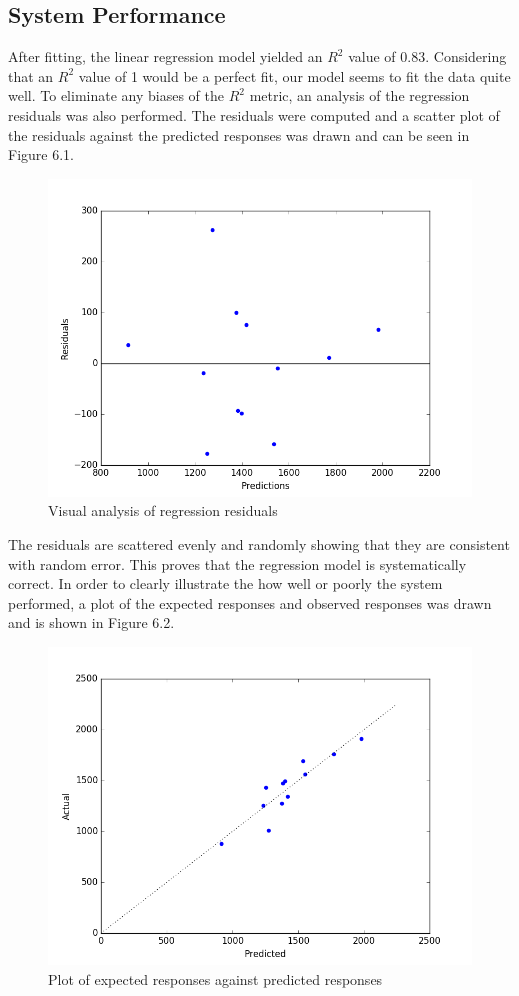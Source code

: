 \subsection{System Performance}
After fitting, the linear regression model yielded an $R^2$ value of $0.83$. Considering that an $R^2$ value of 1 would be a perfect fit, our model seems to fit the data quite well. To eliminate any biases of the $R^2$ metric, an analysis of the regression residuals was also performed. The residuals were computed and a scatter plot of the residuals against the predicted responses was drawn and can be seen in Figure 6.1.
\begin{figure}[ht!]
\centering
\includegraphics[scale=0.5]{Images/residuals}
\caption{Visual analysis of regression residuals}
\label{fig1}
\end{figure}
The residuals are scattered evenly and randomly showing that they are consistent with random error. This proves that the regression model is systematically correct. In order to clearly illustrate the how well or poorly the system performed, a plot of the expected responses and observed responses was drawn and is shown in Figure 6.2.
\begin{figure}[ht!]
\centering
\includegraphics[scale=0.5]{Images/ac_v_pred}
\caption{Plot of expected responses against predicted responses}
\label{fig1}
\end{figure}
